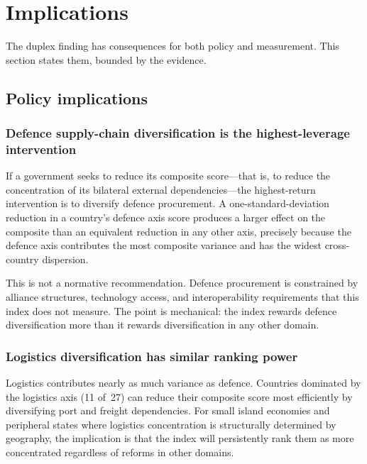 \section{Implications}\label{sec:implications}

The duplex finding has consequences for both policy and measurement.
This section states them, bounded by the evidence.

\subsection{Policy implications}

\subsubsection{Defence supply-chain diversification is the
  highest-leverage intervention}

If a government seeks to reduce its {\ISI} composite score---that is,
to reduce the concentration of its bilateral external
dependencies---the highest-return intervention is to diversify
defence procurement.  A one-standard-deviation reduction in a
country's defence axis score produces a larger effect on the composite
than an equivalent reduction in any other axis, precisely because
the defence axis contributes the most composite variance and has
the widest cross-country dispersion.

This is not a normative recommendation.  Defence procurement is
constrained by alliance structures, technology access, and
interoperability requirements that this index does not measure.  The
point is mechanical: the index rewards defence diversification more
than it rewards diversification in any other domain.

\subsubsection{Logistics diversification has similar ranking power}

Logistics contributes nearly as much variance as defence.  Countries
dominated by the logistics axis (11 of~27) can reduce their composite
score most efficiently by diversifying port and freight
dependencies.  For small island economies and peripheral states
where logistics concentration is structurally determined by
geography, the implication is that the index will persistently
rank them as more concentrated regardless of reforms in other domains.

